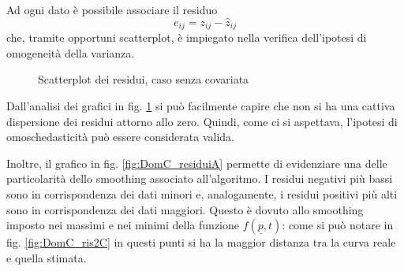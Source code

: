 \documentclass[a4paper,11pt,twoside,openright]{book}							%
\begin{document}
Ad ogni dato è possibile associare il residuo
$$
e_{ij}=z_{ij}-\hat{z}_{ij}
$$
che, tramite opportuni scatterplot, è impiegato nella verifica dell'ipotesi di omogeneità della varianza.
\newpage
\begin{figure}[t]
	\centering
	\caption{Scatterplot dei residui, caso senza covariata}
	\label{fig:DomC_residui}
\end{figure}
Dall'analisi dei grafici in fig. \ref{fig:DomC_residui} si può facilmente capire che non si ha una cattiva dispersione dei residui attorno allo zero. Quindi, come ci si aspettava, l'ipotesi di omoschedasticità può essere considerata valida.

Inoltre, il grafico in fig. \ref{fig:DomC_residuiA} permette di evidenziare una delle particolarità dello smoothing associato all'algoritmo. I residui negativi più bassi sono in corrispondenza dei dati minori e, analogamente, i residui positivi più alti sono in corrispondenza dei dati maggiori. Questo è dovuto allo smoothing imposto nei massimi e nei minimi della funzione $f(\underline{p},t)$: come si può notare in fig. \ref{fig:DomC_ris2C} in questi punti si ha la maggior distanza tra la curva reale e quella stimata.
\end{document}
